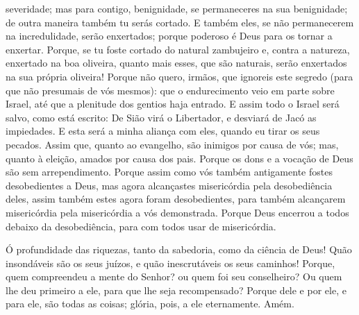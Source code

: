 severidade; mas para contigo, benignidade, se permaneceres na sua
benignidade; de outra maneira também tu serás cortado. E
também eles, se não permanecerem na incredulidade, serão enxertados;
porque poderoso é Deus para os tornar a enxertar. Porque, se
tu foste cortado do natural zambujeiro e, contra a natureza,
enxertado na boa oliveira, quanto mais esses, que são naturais,
serão enxertados na sua própria oliveira! Porque não quero,
irmãos, que ignoreis este segredo (para que não presumais de vós
mesmos): que o endurecimento veio em parte sobre Israel, até que a
plenitude dos gentios haja entrado. E assim todo o Israel
será salvo, como está escrito: De Sião virá o Libertador, e desviará
de Jacó as impiedades. E esta será a minha aliança com eles,
quando eu tirar os seus pecados. Assim que, quanto ao
evangelho, são inimigos por causa de vós; mas, quanto à eleição,
amados por causa dos pais. Porque os dons e a vocação de Deus
são sem arrependimento. Porque assim como vós também
antigamente fostes desobedientes a Deus, mas agora alcançastes
misericórdia pela desobediência deles, assim também estes
agora foram desobedientes, para também alcançarem misericórdia pela
misericórdia a vós demonstrada. Porque Deus encerrou a todos
debaixo da desobediência, para com todos usar de misericórdia.

Ó profundidade das riquezas, tanto da sabedoria, como da ciência
de Deus! Quão insondáveis são os seus juízos, e quão inescrutáveis
os seus caminhos! Porque, quem compreendeu a mente do Senhor?
ou quem foi seu conselheiro? Ou quem lhe deu primeiro a ele,
para que lhe seja recompensado? Porque dele e por ele, e para
ele, são todas as coisas; glória, pois, a ele eternamente. Amém.

\medskip

